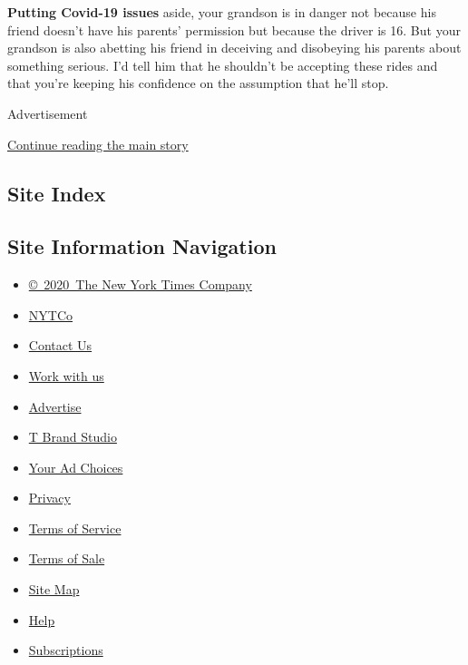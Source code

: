 \textbf{Putting Covid-19 issues} aside, your grandson is in danger not
because his friend doesn't have his parents' permission but because the
driver is 16. But your grandson is also abetting his friend in deceiving
and disobeying his parents about something serious. I'd tell him that he
shouldn't be accepting these rides and that you're keeping his
confidence on the assumption that he'll stop.

Advertisement

\protect\hyperlink{after-bottom}{Continue reading the main story}

\hypertarget{site-index}{%
\subsection{Site Index}\label{site-index}}

\hypertarget{site-information-navigation}{%
\subsection{Site Information
Navigation}\label{site-information-navigation}}

\begin{itemize}
\tightlist
\item
  \href{https://help.nytimes3xbfgragh.onion/hc/en-us/articles/115014792127-Copyright-notice}{©~2020~The
  New York Times Company}
\end{itemize}

\begin{itemize}
\tightlist
\item
  \href{https://www.nytco.com/}{NYTCo}
\item
  \href{https://help.nytimes3xbfgragh.onion/hc/en-us/articles/115015385887-Contact-Us}{Contact
  Us}
\item
  \href{https://www.nytco.com/careers/}{Work with us}
\item
  \href{https://nytmediakit.com/}{Advertise}
\item
  \href{http://www.tbrandstudio.com/}{T Brand Studio}
\item
  \href{https://www.nytimes3xbfgragh.onion/privacy/cookie-policy\#how-do-i-manage-trackers}{Your
  Ad Choices}
\item
  \href{https://www.nytimes3xbfgragh.onion/privacy}{Privacy}
\item
  \href{https://help.nytimes3xbfgragh.onion/hc/en-us/articles/115014893428-Terms-of-service}{Terms
  of Service}
\item
  \href{https://help.nytimes3xbfgragh.onion/hc/en-us/articles/115014893968-Terms-of-sale}{Terms
  of Sale}
\item
  \href{https://spiderbites.nytimes3xbfgragh.onion}{Site Map}
\item
  \href{https://help.nytimes3xbfgragh.onion/hc/en-us}{Help}
\item
  \href{https://www.nytimes3xbfgragh.onion/subscription?campaignId=37WXW}{Subscriptions}
\end{itemize}
